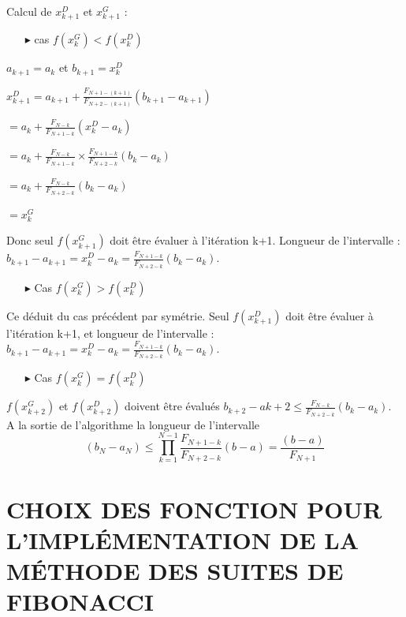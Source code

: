 \documentclass[a4paper,14pt]{article}
\begin{document}
Calcul de $x_{k+1}^{D}$ et $x_{k+1}^{G}$ :\\
\begin{itemize}
\item[$\blacktriangleright$] cas $f (x_{k}^{G}) < f (x_{k}^{D})$
\end{itemize}
\begin{list}{•}{}
	\item $a_{k+1} = a_{k}$ et $b_{k+1} = x_{k}^{D}$
	\item $x_{k+1}^{D} = a_{k+1} + \frac{F_{N+1-(k+1)}}{F_{N+2-(k+1)}}(b_{k+1}-a_{k+1})$
	\item $= a_{k} + \frac{F_{N-k}}{F_{N+1-k}}(x_{k}^{D} - a_{k})$
	\item $= a_{k} + \frac{F_{N-k}}{F_{N+1-k}} \times \frac{F_{N+1-k}}{F_{N+2-k}}(b_{k}-a_{k})$
	\item $= a_{k} + \frac{F_{N-k}}{F_{N+2-k}}(b_{k}-a_{k})$
	\item $= x_{k}^{G}$
\end{list}
Donc seul $f(x_{k+1}^{G})$ doit être évaluer à l'itération k+1.
Longueur de l'intervalle : $b_{k+1}-a_{k+1} = x_{k}^{D}-a_{k} = \frac{F_{N+1-k}}{F_{N+2-k}}(b_{k}-a_{k})$.\\
\begin{itemize}
\item[$\blacktriangleright$] Cas $f (x_{k}^{G}) > f (x_{k}^{D})$
\end{itemize}
Ce déduit du cas précédent par symétrie. Seul $f(x_{k+1}^{D})$ doit être évaluer à l'itération k+1, et
longueur de l'intervalle : $b_{k+1}-a_{k+1} = x_{k}^{D}-a_{k} = \frac{F_{N+1-k}}{F_{N+2-k}}(b_{k}-a_{k})$.\\
\begin{itemize}
\item[$\blacktriangleright$] Cas $f (x_{k}^{G}) = f (x_{k}^{D})$
\end{itemize}
$f(x_{k+2}^{G})$ et $f(x_{k+2}^{D})$ doivent être évalués
$b_{k+2}-a{k+2} \leq \frac{F_{N-k}}{F_{N+2-k}}(b_{k}-a_{k})$.\\

A la sortie de l'algorithme la longueur de l'intervalle 
\[
(b_{N}-a_{N}) \leq \prod_{k=1}^{N-1}\frac{F_{N+1-k}}{F_{N+2-k}}(b-a) = \frac{(b-a)}{F_{N+1}} 
\]

\section{CHOIX DES FONCTION POUR L’IMPLÉMENTATION DE LA MÉTHODE DES SUITES DE FIBONACCI}
\end{document}
